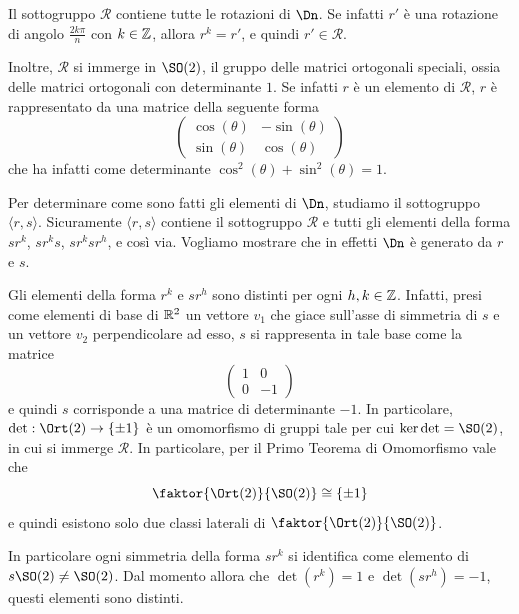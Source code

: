 \documentclass[11pt]{scrartcl}
\begin{document}
	\begin{remark}
		Il sottogruppo $\mathcal{R}$ contiene tutte le rotazioni di $\Dn$.
		Se infatti $r'$ è una rotazione di angolo $\frac{2k\pi}{n}$ con $k \in \mathbb Z$,
		allora $r^k = r'$, e quindi $r' \in \mathcal{R}$. \medskip
		
		
		Inoltre, $\mathcal{R}$ si immerge in $\SO(2)$, il gruppo delle matrici ortogonali speciali,
		ossia delle matrici ortogonali con determinante $1$. Se infatti $r$ è un elemento
		di $\mathcal{R}$, $r$
		è rappresentato da una matrice della seguente forma
		\[ \begin{pmatrix}
			\cos(\theta) & -\sin(\theta) \\
			\sin(\theta) & \cos(\theta)
		\end{pmatrix} \]
		che ha infatti come determinante $\cos^2(\theta) + \sin^2(\theta) = 1$.
	\end{remark}
	
	Per determinare come sono fatti gli elementi di $\Dn$, studiamo il sottogruppo
	$\langle r, s\rangle$. Sicuramente $\langle r, s\rangle$ contiene il sottogruppo $\mathcal{R}$
	e tutti gli elementi della forma $sr^k$, $sr^ks$, $sr^ksr^h$, e così via. Vogliamo
	mostrare che in effetti $\Dn$ è generato da $r$ e $s$.
	
	\begin{remark}
		\label{obs1.11}
		Gli elementi della forma $r^k$ e $sr^h$ sono distinti per ogni $h, k \in \mathbb Z$.
		Infatti, presi come elementi di base di $\mathbb R^2$ un vettore $v_1$ che giace sull'asse
		di simmetria di $s$ e un vettore $v_2$ perpendicolare ad esso, $s$
		si rappresenta in tale base come la matrice
		\[ \begin{pmatrix}
			1 & 0 \\
			0 & -1
		\end{pmatrix} \]
		e quindi $s$ corrisponde a una matrice di determinante $-1$. In particolare,
		$\det : \Ort(2) \to \{\pm 1\}$ è un omomorfismo di gruppi tale per cui
		$\ker \det = \SO(2)$, in cui si immerge $\mathcal{R}$. In particolare, per
		il Primo Teorema di Omomorfismo vale che
		\[ \faktor{\Ort(2)}{\SO(2)} \cong \{\pm 1\} \]
		e quindi
		esistono solo due classi laterali di $\faktor{\Ort(2)}{\SO(2)}$. \medskip
		
		
		In particolare
		ogni simmetria della forma $s r^k$ si identifica come elemento di $s \SO(2) \neq \SO(2)$.
		Dal momento allora che $\det(r^k) = 1$ e $\det(sr^h) = -1$, questi elementi sono
		distinti.
	\end{remark}
	
\end{document}
